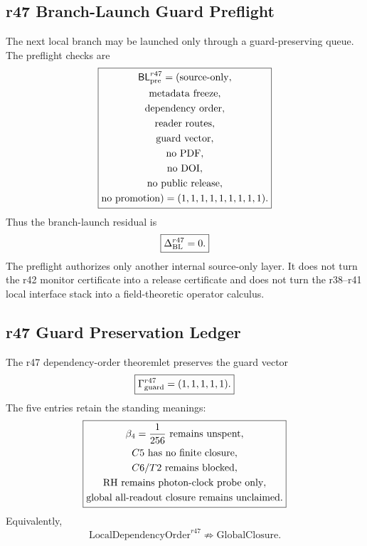 \subsection{r47 Branch-Launch Guard Preflight}
\label{subsec:r47-branch-launch-guard-preflight}

The next local branch may be launched only through a guard-preserving queue.
The preflight checks are
\[
\boxed{
\begin{gathered}
\mathsf{BL}_{\rm pre}^{r47}
=
(
\mathrm{source\mbox{-}only},\\
\mathrm{metadata\ freeze},\\
\mathrm{dependency\ order},\\
\mathrm{reader\ routes},\\
\mathrm{guard\ vector},\\
\mathrm{no\ PDF},\\
\mathrm{no\ DOI},\\
\mathrm{no\ public\ release},\\
\mathrm{no\ promotion}
)
=(1,1,1,1,1,1,1,1,1).
\end{gathered}
}
\]
Thus the branch-launch residual is
\[
\boxed{
\Delta_{\rm BL}^{r47}=0.
}
\]
The preflight authorizes only another internal source-only layer.  It does not
turn the r42 monitor certificate into a release certificate and does not turn the
r38--r41 local interface stack into a field-theoretic operator calculus.

\subsection{r47 Guard Preservation Ledger}
\label{subsec:r47-guard-preservation-ledger}

The r47 dependency-order theoremlet preserves the guard vector
\[
\boxed{
\Gamma_{\rm guard}^{r47}=(1,1,1,1,1).
}
\]
The five entries retain the standing meanings:
\[
\boxed{
\begin{gathered}
\beta_4={1\over256}\text{ remains unspent},\\
C5\text{ has no finite closure},\\
C6/T2\text{ remains blocked},\\
\mathrm{RH}\text{ remains photon-clock probe only},\\
\text{global all-readout closure remains unclaimed}.
\end{gathered}
}
\]
Equivalently,
\[
\boxed{
\mathrm{LocalDependencyOrder}^{r47}
\not\Rightarrow
\mathrm{GlobalClosure}.
}
\]


